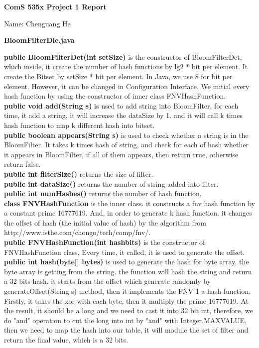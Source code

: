 \documentclass[a4paper,14pt]{article}
\begin{document}
\vspace*{\fill}
\begingroup
\centering
\textbf{{\Large ComS 535x Project 1 Report }}

\vspace{1cm}

Name: Chenguang He

\endgroup
\vspace*{\fill}

\clearpage

\begin{center}
\textbf{{\large BloomFilterDie.java}}
\end{center}
\textbf{public BloomFilterDet(int setSize)} is the constructor of BloomFilterDet, which inside, it create the number of hash functions by lg2 * bit per element. It create the Bitset by setSize * bit per element. In Java, we use 8 for bit per element. However, it can be changed in Configuration Interface. We initial every hash function by using the constructor of inner class FNVHashFunction.
\\[6pt]
\textbf{public void add(String s)} is used to add string into BloomFilter, for each time, it add a string, it will increase the dataSize by 1. and it will call k times hash function to map k different hash into bitset.
\\[6pt]
\textbf{public boolean appears(String s)} is used to check whether a string is in the BloomFilter. It takes k times hash of string, and check for each of hash whether it appears in BloomFilter,  if all of them appears, then return true, otherwise return false.
\\[6pt]
\textbf{public int filterSize()} returns the size of filter.
\\[6pt]
\textbf{public int dataSize()} returns the number of string added into filter.
\\[6pt]
\textbf{public int numHashes()} returns the number of hash function.
\\[6pt]
\textbf{class FNVHashFunction} is the inner class. it constructs a fnv hash function by a constant prime 16777619. And, in order to generate k hash function. it changes the offset of hash (the initial value of hash) by the algorithm from http://www.isthe.com/chongo/tech/comp/fnv/.
\\[6pt]
\textbf{public FNVHashFunction(int hashbits)} is the constructor of FNVHashFunction class, Every time, it called, it is used to generate the offset.
\\[6pt]
\textbf{public int hash(byte[] bytes)} is used to generate the hash for byte array. the byte array is getting from the string. the function will hash the string and return a 32 bits hash. it starts from the offset which generate randomly by generateOffset(String s) method, then it implements the FNV 1-a hash function. Firstly, it takes the xor with each byte, then it multiply the prime 16777619. At the result, it should be a long and we need to cast it into 32 bit int, therefore, we do "and" operation to cut the long into int by "and" with Integer.MAXVALUE, then we need to map the hash into our table, it will module the set of filter and return the final value, which is a 32 bits.
\end{document}
